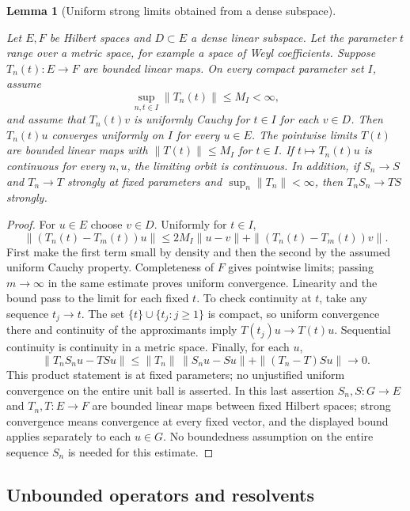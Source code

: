 \documentclass[11pt,a4paper]{article}
\newtheorem{lemma}[theorem]{Lemma}
\theoremstyle{definition}
\theoremstyle{remark}
\newcommand{\proofid}[1]{\par\smallskip{\normalfont\scriptsize\color{inkblue}Stable ID: \nolinkurl{#1}}\par\smallskip}
\begin{document}
\begin{lemma}[Uniform strong limits obtained from a dense subspace]
\label{basic:dense-strong-limit}
\proofid{basic:dense-strong-limit}
\par{}\par\smallskip

Let $E,F$ be Hilbert spaces and $D\subset E$ a dense linear subspace.
Let the parameter $t$ range over a metric space, for example a space of Weyl coefficients.
Suppose $T_n(t):E\to F$ are bounded linear maps. On every compact
parameter set $I$, assume
\[
 \sup_{n,t\in I}\|T_n(t)\|\leq M_I<\infty,
\]
and assume that $T_n(t)v$ is uniformly Cauchy for $t\in I$ for each
$v\in D$. Then $T_n(t)u$ converges uniformly on $I$ for every $u\in E$.
The pointwise limits $T(t)$ are bounded linear maps with
$\|T(t)\|\leq M_I$ for $t\in I$. If $t\mapsto T_n(t)u$ is continuous
for every $n,u$, the limiting orbit is continuous. In addition, if
$S_n\to S$ and $T_n\to T$ strongly at fixed parameters and
$\sup_n\|T_n\|<\infty$, then $T_nS_n\to TS$ strongly.
\end{lemma}
\begin{proof}
For $u\in E$ choose $v\in D$. Uniformly for $t\in I$,
\[
 \|(T_n(t)-T_m(t))u\|
 \leq2M_I\|u-v\|+\|(T_n(t)-T_m(t))v\|.
\]
First make the first term small by density and then the second by the
assumed uniform Cauchy property. Completeness of $F$ gives pointwise
limits; passing $m\to\infty$ in the same estimate proves uniform
convergence. Linearity and the bound pass to the limit for each fixed
$t$. To check continuity at $t$, take any sequence $t_j\to t$.
The set $\{t\}\cup\{t_j:j\geq1\}$ is compact, so uniform
convergence there and continuity of the approximants imply
$T(t_j)u\to T(t)u$. Sequential continuity is continuity in a metric
space. Finally, for each $u$,
\[
 \|T_nS_nu-TSu\|
 \leq\|T_n\|\,\|S_nu-Su\|+\|(T_n-T)Su\|\longrightarrow0.
\]
This product statement is at fixed parameters; no unjustified uniform
convergence on the entire unit ball is asserted. In this last assertion
$S_n,S:G\to E$ and $T_n,T:E\to F$ are bounded linear maps between
fixed Hilbert spaces; strong convergence means convergence at every
fixed vector, and the displayed bound applies separately to each
$u\in G$. No boundedness assumption on the entire sequence $S_n$ is
needed for this estimate.
\end{proof}


\subsection{Unbounded operators and resolvents}
\end{document}
